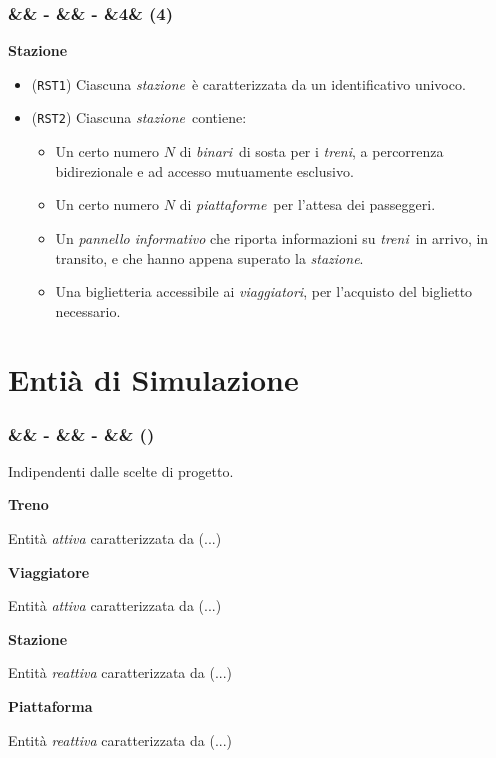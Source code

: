 \documentclass[slidestop,compress,blackandwhite]{beamer}
\newcommand{\ttt}[1]{\texttt{#1}}
\newcommand{\ii}[1]{\textit{#1}}
\newcommand{\treni}{\ii{treni}}
\newcommand{\viaggiatori}{\ii{viaggiatori}}
\newcommand{\stazione}{\ii{stazione}}
\newcommand{\piattaforme}{\ii{piattaforme}}
\newcommand{\binari}{\ii{binari}}
\newcommand{\newtitle}[4]{
	#1 
	\ifx&#2&%
	\else
  		\large- #2
	\fi
	\ifx&#3&%
	\else
  		\normalsize- #3
	\fi
	\ifx&#4&%
	\else
  		\normalsize (#4)
	\fi
}
\newcommand{\newframe}[5]{
	\begin{frame}
		\frametitle{\newtitle{#1}{#2}{#3}{#4}}
		#5
	\end{frame}
}
\newcommand{\itemt}[1]{\item (\ttt{#1})}
\begin{document}
	\newframe{}{}{}{4}{
		\vspace{0.5cm}
		\textbf{Stazione}
		\begin{itemize}
			\itemt{RST1} Ciascuna \stazione~è caratterizzata da un identificativo univoco.
			\itemt{RST2} Ciascuna \stazione~contiene:
				\begin{itemize}
					\item Un certo numero $N$ di \binari~di sosta per i \treni, a percorrenza bidirezionale e ad accesso mutuamente esclusivo.
					\item Un certo numero $N$ di \piattaforme~per l'attesa dei passeggeri.
					\item Un \ii{pannello informativo} che riporta informazioni su \treni~in arrivo, in transito, e che hanno appena superato la \stazione.
					\item Una biglietteria accessibile ai \viaggiatori, per l'acquisto del biglietto necessario.
				\end{itemize}
		\end{itemize} 
	}


\section{Entià di Simulazione}\label{entities}

	\newframe{}{}{}{}{
		Indipendenti dalle scelte di progetto.
		
		\vspace{0.4cm}
		\textbf{Treno} \\
		
			\begin{addmargin}[2em]{0em}
			Entità \ii{attiva} caratterizzata da (...)
			\end{addmargin}
	
		\textbf{Viaggiatore} \\
		
			\begin{addmargin}[2em]{0em}
			Entità \ii{attiva} caratterizzata da (...)
			\end{addmargin}
		
		\textbf{Stazione} \\
		
			\begin{addmargin}[2em]{0em}
			Entità \ii{reattiva} caratterizzata da (...)
			\end{addmargin}
			
		\textbf{Piattaforma} \\
		
			\begin{addmargin}[2em]{0em}
			Entità \ii{reattiva} caratterizzata da (...)
			\end{addmargin}
	
	}
\end{document}

